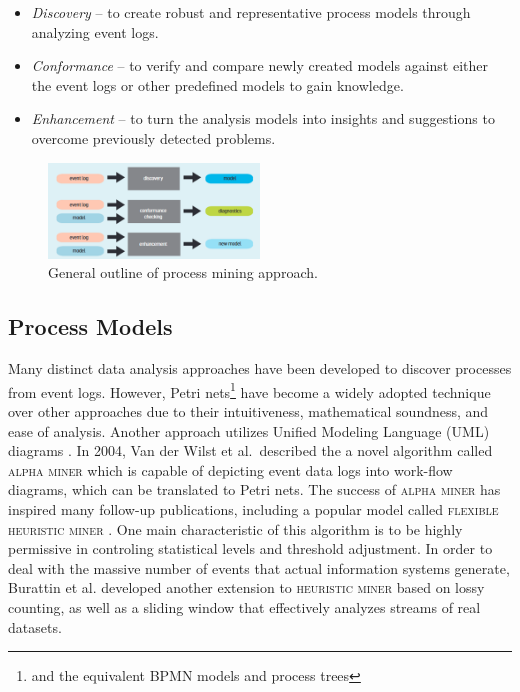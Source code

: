 \documentclass[conference]{IEEEtran}
\begin{document}
\begin{itemize}
\item \textit{Discovery} --
to create robust and representative process models through
 analyzing event logs.

\item \textit{Conformance} -- to verify and compare newly created
models against either the event logs or other predefined models
to gain knowledge.

\item \textit{Enhancement} -- to turn the analysis 
models into insights and suggestions to overcome previously
detected problems.
\end{itemize}

\begin{figure}[htbp]
\centerline{\includegraphics[width=0.5\textwidth]{images/image1.png}}
\caption{General outline of process mining approach.}
\label{fig-layout}
\end{figure}

\subsection{Process Models}

Many distinct data analysis approaches have been developed to discover
processes from event logs. However, Petri nets\footnote{and the
equivalent BPMN models and process trees} have become a
widely adopted technique over other approaches \cite{Cook1998} due to their
intuitiveness, mathematical soundness, and ease of analysis.
Another approach utilizes Unified
Modeling Language (UML) diagrams \cite{Sait2019}.
In 2004, Van der Wilst et al.~described the 
a novel algorithm
called \textsc{alpha miner}\cite{van2004} which
is capable of depicting event data logs into
work-flow diagrams, which can be translated to Petri nets.
The success of \textsc{alpha miner} has inspired many follow-up publications,
including a popular model
called \textsc{flexible heuristic miner} \cite{Weij2006}.
One main characteristic of this
algorithm is to be highly permissive in controling statistical levels and
threshold adjustment. In order to deal with the
massive number of events that actual information systems generate,
Burattin et al. \cite{Bura2014} developed another extension to
\textsc{heuristic miner} based on
lossy counting, as well as a sliding window that effectively analyzes
streams of real datasets.
\end{document}
